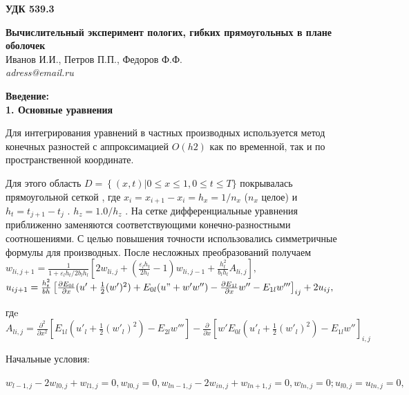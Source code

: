 \documentclass[12pt,letterpaper]{extreport}
\begin{document}
\pagestyle{empty}

\begin{flushright}
{\bfseries \large УДК 539.3}
\end{flushright}

\begin{center}
\textbf{Вычислительный эксперимент пологих, гибких прямоугольных в плане оболочек}\\
Иванов И.И., Петров П.П., Федоров Ф.Ф.\\
\textit{adress@email.ru}\\
\end{center}

\textbf{Введение:\\
1.	Основные уравнения}
\par Для интегрирования уравнений в частных производных используется метод конечных разностей с аппроксимацией $O(h2)$ как по временной, так и по пространственной координате. 
\par Для этого область $D=\left\{(x,t)|0\leq x \leq 1 , 0 \leq t \leq T\} \right. $  покрывалась прямоугольной сеткой  , где $x_i =x_{i+1} - x_i=h_x=1/n_x$  ($n_x$  целое) и $h_t=t_{j+1}-t_j$ . $h_z =1.0/h_z$ . На сетке дифференциальные уравнения приближенно заменяются соответствующими конечно-разностными соотношениями. С целью повышения точности использовались симметричные формулы для производных. После несложных преобразований  получаем\\
$w_{li, j+1}=\frac{1}{1+\varepsilon_l h_t /2b_l h_l} \left[2w_{li,j}+(\frac{\varepsilon_l h_t}{2h_l}-1)w_{li,j-1}+\frac{h_t^2}{b_l h_l}A_{li,j}\right],$
\\$u_{ij+1}=\frac{h_t^2}{bh}
\left[\frac{\partial E_{0l}}{\partial x}(u'+\frac{1}{2}(w')^2)+E_{0l}(u"+w'w'')-\frac{\partial E_{1l}}{\partial x}w'' - E_{1l}w''' 
\right]_{ij} +2u_{ij},$\\
\par гдe\\
$A_{li,j}=\frac{\partial^2}{\partial x^2}\left[E_{1l}(u'_l + \frac{1}{2}(w'_l)^2)-E_{2l}w'''\right] -\frac{\partial}{\partial x}\left[w'E_{0l}(u'_l +\frac{1}{2}(w'_l)^2)-E_{1l}w''\right]_{i,j}$\\




\par Начальные условия:

$w_{l-1,j} - 2w_{l0,j} + w_{l1,j} = 0, w_{l0,j} = 0, w_{ln-1,j} - 2w_{in,j} + w_{ln+1,j} = 0, w_{ln,j} =0; u_{l0, j}= u_{ln,j} = 0, $
\end{document}
